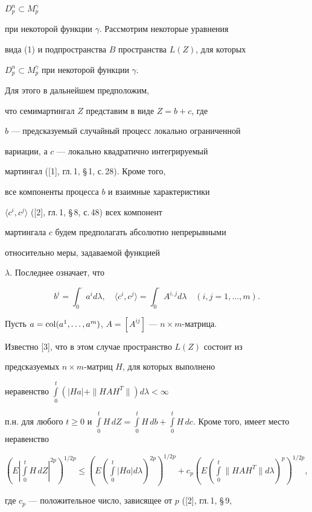 $D_p^n \subset M_p^\gamma $


при некоторой функции $\gamma $. Рассмотрим некоторые уравнения


вида (1) и подпространства $B$ пространства $L(Z)$, для которых


$D_p^n \subset M_p^\gamma $ при некоторой функции $\gamma$.


Для этого в дальнейшем предположим,


что семимартингал $Z$ представим в виде $Z = b + c$, где


$b$ --- предсказуемый случайный процесс локально ограниченной


вариации, а $c$ --- локально квадратично интегрируемый


мартингал ([1], гл.\,1, \S\,1, с.\,28). Кроме того,


все компоненты процесса $b$ и взаимные характеристики


$\langle c^i,c^j\rangle$ ([2], гл.\,1, \S\,8, с.\,48) всех компонент


мартингала $c$ будем предполагать абсолютно непрерывными


относительно меры, задаваемой функцией


$\lambda$. Последнее означает, что


$$


b^i = \int_0^\cdot a^id\lambda, \quad


\langle c^i,c^j\rangle = \int_0^\cdot A^{i,j}d\lambda


\quad (i, j = 1,\dotsc,m).


$$


Пусть $a=\operatorname{col}(a^1,\dotsc,a^m)$, $A = [A^{ij}]$ --- $n\times m$-матрица.


Известно [3], что в этом случае пространство $L(Z)$ состоит из


предсказуемых $n\times m$-матриц $H$, для которых выполнено


неравенство $\int \limits _0^t(|Ha| +\|HAH^T\|)d\lambda < \infty$


п.н. для любого $t\ge0$ и $\int\limits_0^t H\,dZ=\int\limits_0^tH\,db


+ \int \limits _0^tH\,dc$. Кроме того, имеет место неравенство


$(E|\int \limits _0^tH\,dZ|^{2p})^{1/2p} \le (E(\int \limits


_0^t|Ha|d\lambda )^


{2p})^{1/2p} + c_p(E(\int \limits _0^t\|HAH^T\|d\lambda )^p)^{1/2p}$,


где $c_p$ --- положительное число, зависящее от $p$ ([2], гл.\,1, \S\,9,


